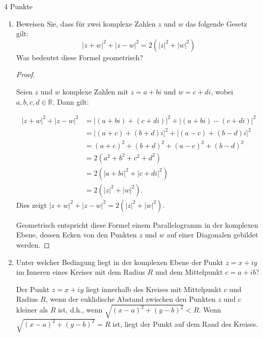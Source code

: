 \documentclass{problemset}
\begin{document}
\begin{problem}{4 Punkte}
\begin{enumerate}
    \item Beweisen Sie, dass für zwei komplexe Zahlen $z$ und $w$ das folgende
          Gesetz gilt:
          \[ |z + w|^2 + |z - w|^2 = 2(|z|^2 + |w|^2) \]
          Was bedeutet diese Formel geometrisch?

          \begin{proof}
              $ $

              Seien $z$ und $w$ komplexe Zahlen mit $z = a + bi$ und $w = c +
              di$, wobei $a, b, c, d \in \mathbb{R}$. Dann gilt:

              \begin{align*}
                  |z + w|^2 + |z - w|^2 & = |(a + bi) + (c + di)|^2 + |(a + bi) - (c + di)|^2 \\
                                        & = |(a + c) + (b + d)i|^2 + |(a - c) + (b - d)i|^2   \\
                                        & = (a + c)^2 + (b + d)^2 + (a - c)^2 + (b - d)^2     \\
                                        & = 2(a^2 + b^2 + c^2 + d^2)                          \\
                                        & = 2(|a + bi|^2 + |c + di|^2)                        \\
                                        & = 2(|z|^2 + |w|^2).
              \end{align*}
              Dies zeigt $|z + w|^2 + |z - w|^2 = 2(|z|^2 + |w|^2)$.

              Geometrisch entspricht diese Formel einem Parallelogramm in der
              komplexen Ebene, dessen Ecken von den Punkten $z$ und $w$ auf
              einer Diagonalen gebildet werden.
          \end{proof}

    \item Unter welcher Bedingung liegt in der komplexen Ebene der Punkt $z = x
          + iy$ im Inneren eines Kreises mit dem Radius $R$ und dem Mittelpunkt
          $c = a + ib$?

          Der Punkt $z = x + iy$ liegt innerhalb des Kreises mit Mittelpunkt
          $c$ und Radius $R$, wenn der euklidische Abstand zwischen den Punkten
          $z$ und $c$ kleiner als $R$ ist, d.h., wenn $\sqrt{(x - a)^2 + (y -
          b)^2} < R$. Wenn $\sqrt{(x - a)^2 + (y - b)^2} = R$ ist, liegt der
          Punkt auf dem Rand des Kreises.


\end{enumerate}
\end{problem}
\end{document}
